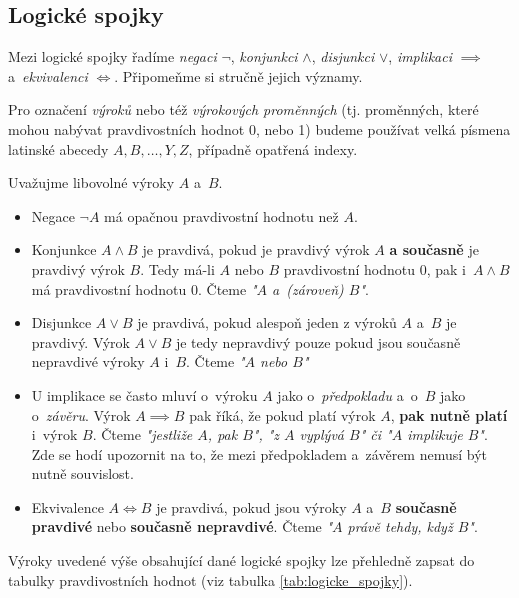 \subsection{Logické spojky}\label{subsec:logicke_spojky}
Mezi logické spojky řadíme \emph{negaci} $\neg$, \emph{konjunkci} $\land$, \emph{disjunkci} $\lor$, \emph{implikaci} $\implies$ a~\emph{ekvivalenci} $\iff$. Připomeňme si stručně jejich významy.
\begin{convention}
    \label{conv:abeceda_vyrokovych_promennych}
    Pro označení \emph{výroků} nebo též \emph{výrokových proměnných} (tj. proměnných, které mohou nabývat pravdivostních hodnot 0, nebo 1) budeme používat velká písmena latinské abecedy $A,B,\dots,Y,Z$, případně opatřená indexy.
\end{convention}
Uvažujme libovolné výroky $A$ a~$B$.
\begin{itemize}
    \item Negace $\neg A$ má opačnou pravdivostní hodnotu než $A$.
    \item Konjunkce $A \land B$ je pravdivá, pokud je pravdivý výrok $A$ \textbf{a současně} je pravdivý výrok $B$. Tedy má-li $A$ nebo $B$ pravdivostní hodnotu 0, pak i~$A \land B$ má pravdivostní hodnotu 0. Čteme \emph{"$A$ a~(zároveň) $B$"}.
    \item Disjunkce $A \lor B$ je pravdivá, pokud alespoň jeden z výroků $A$ a~$B$ je pravdivý. Výrok $A \lor B$ je tedy nepravdivý pouze pokud jsou současně nepravdivé výroky $A$ i~$B$. Čteme \emph{"$A$ nebo $B$"}
    \item U implikace se často mluví o~výroku $A$ jako o~\emph{předpokladu} a~o~$B$ jako o~\emph{závěru}. Výrok $A \implies B$ pak říká, že pokud platí výrok $A$, \textbf{pak nutně platí} i~výrok $B$. Čteme \emph{"jestliže $A$, pak $B$", "z $A$ vyplývá $B$" či "$A$ implikuje $B$"}. Zde se hodí upozornit na to, že mezi předpokladem a~závěrem nemusí být nutně souvislost.
    \item Ekvivalence $A \iff B$ je pravdivá, pokud jsou výroky $A$ a~$B$ \textbf{současně pravdivé} nebo \textbf{současně nepravdivé}. Čteme \emph{"$A$ právě tehdy, když $B$"}.
\end{itemize}
Výroky uvedené výše obsahující dané logické spojky lze přehledně zapsat do tabulky pravdivostních hodnot (viz tabulka \ref{tab:logicke_spojky}).
